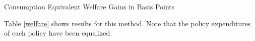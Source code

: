 \documentclass[../HAFiscal]{subfiles}
\begin{document}
\begin{table}[ht] 
	\center
	
	\caption{Consumption Equivalent Welfare Gains in Basis Points }
	\label{welfare}
\end{table}

Table \ref{welfare} shows results for this method. Note that the policy expenditures of each policy have been equalized.
\end{document}
